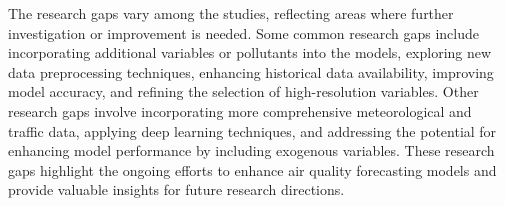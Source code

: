 \par The research gaps vary among the studies, reflecting areas where further investigation or improvement is needed. Some common research gaps include incorporating additional variables or pollutants into the models, exploring new data preprocessing techniques, enhancing historical data availability, improving model accuracy, and refining the selection of high-resolution variables. Other research gaps involve incorporating more comprehensive meteorological and traffic data, applying deep learning techniques, and addressing the potential for enhancing model performance by including exogenous variables. These research gaps highlight the ongoing efforts to enhance air quality forecasting models and provide valuable insights for future research directions.



